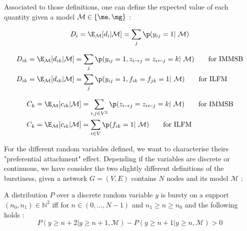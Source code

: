 \newcommand{\M}{\mathcal{M}}

Associated to those definitions, one can define the expected value of each quantity given a model $\M \in \{\me, \mg\}$ :

\begin{lemma}
    \begin{equation}
        D_i = \E_\M[d_i | \M] = \sum_j \p(y_{ij}=1 | \M)
    \end{equation}
\end{lemma}

\begin{lemma}
    \begin{align}
        D_{ik} &= \E_\M[d_{ik} | \M] = \sum_j \p(y_{ij}=1, z_{i\rightarrow j}=z_{i\leftarrow j}=k | \M) \qquad \textrm{for IMMSB} \\
        D_{ik} &= \E_\M[d_{ik} | \M] = \sum_j \p(y_{ij}=1, f_{ik}=f_{jk}=1 | \M) \qquad \textrm{for ILFM}
    \end{align}
\end{lemma}

\begin{lemma}
    \begin{align}
        C_k &= \E_\M[c_{ik} | \M] = \sum_{i,j \in V^2} \p(z_{i\rightarrow j}=z_{i\leftarrow j}=k | \M) \qquad \textrm{for IMMSB} \\
        C_k &= \E_\M[c_{ik} | \M] = \sum_{i \in V} \p(f_{ik}=1 | \M) \qquad \textrm{for ILFM}
    \end{align}
\end{lemma}

For the different random variables defined, we want to characterise theirs "preferential attachment" effect. Depending if the variables are discrete or continuous, we have consider the two slightly different definitions of the burstiness, given a network $G=(V,E)$ contains $N$ nodes and its model $\M$  :

\begin{definition} \label{discrete_burstiness}
    A distribution $P$ over a discrete random variable $y$ is bursty on a support $(n_0, n_1) \in \mathbb{N}^2$ iff for $n \in (0,..., N-1)$ and $n_1 \geq  n \geq n_0$ and the following holds : 
    \begin{equation}
        P(y \geq n+2 | y \geq n+1, \M) - P(y \geq n+1 | y \geq n, \M) > 0
    \end{equation}
\end{definition}

